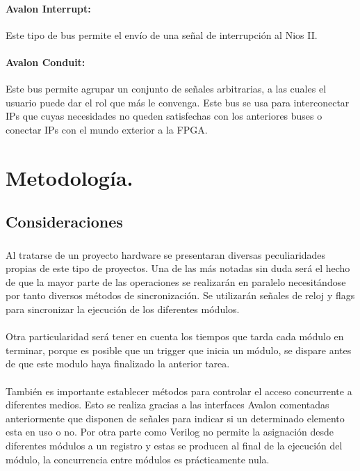 \documentclass[a4paper,12pt,titlepage,final]{book}
\begin{document}
\paragraph{Avalon Interrupt:}
Este tipo de bus permite el envío de una señal de interrupción al Nios II.
 
\paragraph{Avalon Conduit:}
Este bus permite agrupar un conjunto de señales arbitrarias, a las cuales el usuario puede dar el rol que más le convenga. Este bus se usa para interconectar IPs que cuyas necesidades no queden satisfechas con los anteriores buses o conectar IPs con el mundo exterior a la FPGA.

\section{Metodología.}
\subsection{Consideraciones}
\subsubsection*{}

\paragraph{}
Al tratarse de un proyecto hardware se presentaran diversas peculiaridades propias de este tipo de proyectos. Una de las más notadas sin duda será el hecho de que la mayor parte de las operaciones se realizarán en paralelo necesitándose por tanto diversos métodos de sincronización. Se utilizarán señales de reloj y flags para sincronizar la ejecución de los diferentes módulos.

\paragraph{}
Otra particularidad será tener en cuenta los tiempos que tarda cada módulo en terminar, porque es posible que un trigger que inicia un módulo, se dispare antes de que este modulo haya finalizado la anterior tarea.

\paragraph{}
También es importante establecer métodos para controlar el acceso concurrente a diferentes medios. Esto se realiza gracias a las interfaces Avalon comentadas anteriormente que disponen de señales para indicar si un determinado elemento esta en uso o no. Por otra parte como Verilog no permite la asignación desde diferentes módulos a un registro y estas se producen al final de la ejecución del módulo, la concurrencia entre módulos es prácticamente nula.
\end{document}
